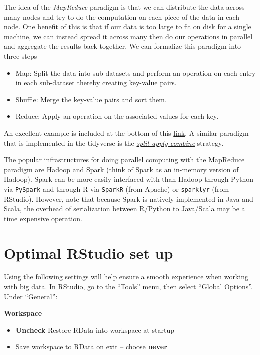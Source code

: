 \documentclass[
]{book}
\providecommand{\tightlist}{%
  \setlength{\itemsep}{0pt}\setlength{\parskip}{0pt}}
\begin{document}
The idea of the \emph{MapReduce} paradigm is that we can distribute the data across many nodes and try to do the computation on each piece of the data in each node. One benefit of this is that if our data is too large to fit on disk for a single machine, we can instead spread it across many then do our operations in parallel and aggregate the results back together. We can formalize this paradigm into three steps

\begin{itemize}
\tightlist
\item
  Map: Split the data into sub-datasets and perform an operation on each entry in each sub-dataset thereby creating key-value pairs.
\item
  Shuffle: Merge the key-value pairs and sort them.
\item
  Reduce: Apply an operation on the associated values for each key.
\end{itemize}

An excellent example is included at the bottom of this \href{https://www.journaldev.com/8848/mapreduce-algorithm-example}{link}. A similar paradigm that is implemented in the tidyverse is the \href{https://www.jstatsoft.org/article/view/v040i01}{\emph{split-apply-combine}} strategy.

The popular infrastructures for doing parallel computing with the MapReduce paradigm are Hadoop and Spark (think of Spark as an in-memory version of Hadoop). Spark can be more easily interfaced with than Hadoop through Python via \texttt{PySpark} and through R via \texttt{SparkR} (from Apache) or \texttt{sparklyr} (from RStudio). However, note that because Spark is natively implemented in Java and Scala, the overhead of serialization between R/Python to Java/Scala may be a time expensive operation.

\hypertarget{optimal-rstudio-set-up}{%
\section{Optimal RStudio set up}\label{optimal-rstudio-set-up}}

Using the following settings will help ensure a smooth experience when working with big data. In RStudio, go to the ``Tools'' menu, then select ``Global Options''. Under ``General'':

\textbf{Workspace}

\begin{itemize}
\tightlist
\item
  \textbf{Uncheck} Restore RData into workspace at startup
\item
  Save workspace to RData on exit -- choose \textbf{never}
\end{itemize}
\end{document}
